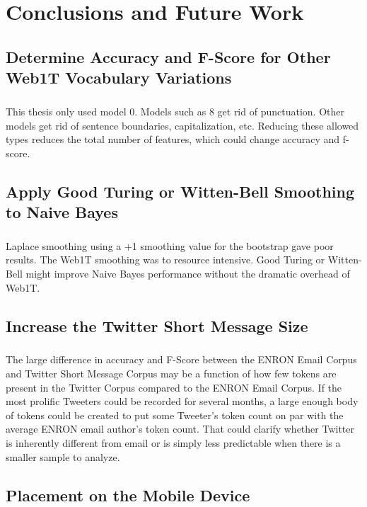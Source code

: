 \chapter{Conclusions and Future Work}

\section{Determine Accuracy and F-Score for Other Web1T Vocabulary Variations}
\paragraph{} This thesis only used model 0.  Models such as 8 get rid of punctuation.  Other models get rid of sentence boundaries, capitalization, etc.  Reducing these allowed types reduces the total number of features, which could change accuracy and f-score.

\section{Apply Good Turing or Witten-Bell Smoothing to Naive Bayes}
\paragraph{} Laplace smoothing using a +1 smoothing value for the bootstrap gave poor results.  The Web1T smoothing was to resource intensive.  Good Turing or Witten-Bell might improve Naive Bayes performance without the dramatic overhead of Web1T.

\section{Increase the Twitter Short Message Size}
	\paragraph{} The large difference in accuracy and F-Score between the ENRON Email Corpus and Twitter Short Message Corpus may be a function of how few tokens are present in the Twitter Corpus compared to the ENRON Email Corpus.  If the most prolific Tweeters could be recorded for several months, a large enough body of tokens could be created to put some Tweeter's token count on par with the average ENRON email author's token count.  That could clarify whether Twitter is inherently different from email or is simply less predictable when there is a smaller sample to analyze.

\section{Placement on the Mobile Device}
\paragraph{} 



